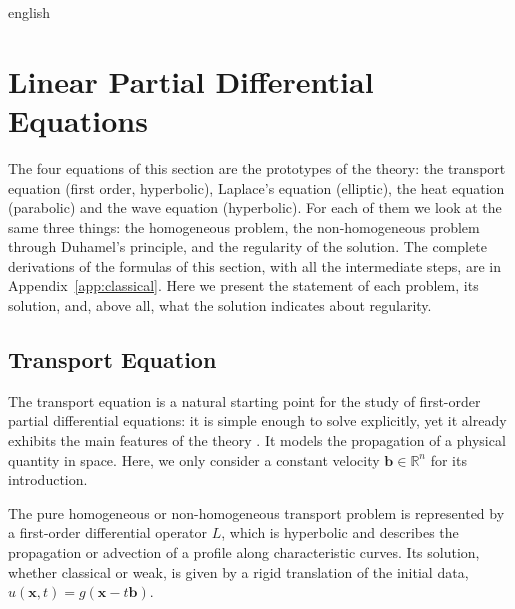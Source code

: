 \documentclass[0000.tex]{subfiles}
\begin{document}
\begin{hyphenrules}{english}
\section{Linear Partial Differential Equations}\label{sec:linear-pdes}

The four equations of this section are the prototypes of the theory: the transport equation (first
order, hyperbolic), Laplace's equation (elliptic), the heat equation (parabolic) and the wave equation
(hyperbolic). For each of them we look at the same three things: the homogeneous problem, the
non-homogeneous problem through Duhamel's principle, and the regularity of the solution.
The complete derivations of the formulas of this section, with all the intermediate steps, are in
Appendix~\ref{app:classical}. Here we present the statement of each problem, its solution, and, above all, 
what the solution indicates about regularity.

\subsection{Transport Equation}\label{subsec:transport}

The transport equation is a natural starting point for the study of first-order partial differential
equations: it is simple enough to solve explicitly, yet it already exhibits the main features of the
theory \cite{evans2010}. It models the propagation of a physical quantity in space. Here, we only
consider a constant velocity $\mathbf{b}\in\mathbb{R}^n$ for its introduction.

The pure homogeneous or non-homogeneous transport problem is represented by a first-order differential
operator $L$, which is hyperbolic and describes the propagation or advection of a profile along
characteristic curves. Its solution, whether classical or weak, is given by a rigid translation of the
initial data, $u(\mathbf{x},t)=g(\mathbf{x}-t\mathbf{b})$.


\end{hyphenrules}
\end{document}
